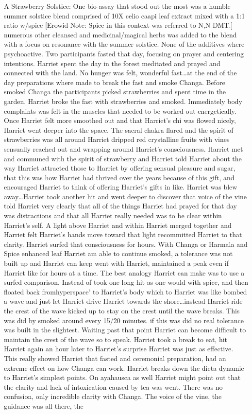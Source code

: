 \documentclass[12pt]{book}
\begin{document}
A Strawberry Solstice: One bio-assay that stood out the most was a humble summer solstice blend comprised of 10X celio caapi leaf extract mixed with a 1:1 ratio w/spice [Erowid Note: Spice in this context was referred to N,N-DMT.] numerous other cleansed and medicinal/magical herbs was added to the blend with a focus on resonance with the summer solstice. None of the additives where psychoactive. Two participants fasted that day, focusing on prayer and centering intentions. Harriet spent the day in the forest meditated and prayed and connected with the land. No hunger was felt, wonderful fast\ldots at the end of the day preparations where made to break the fast and smoke Changa. Before smoked Changa the participants picked strawberries and spent time in the garden. Harriet broke the fast with strawberries and smoked. Immediately body complaints was felt in the muscles that needed to be worked out energetically. Once Harriet felt more smoothed out and that Harriet's chi was flowed nicely, Harriet went deeper into the space. The sacral chakra flared and the spirit of strawberries was all around Harriet dripped red crystalline fruits with vines sensually reached out and wrapping around Harriet's consciousness. Harriet met and communed with the spirit of strawberry and Harriet told Harriet about the way Harriet attracted those to Harriet by offering sensual pleasure and sugar, that this was how Harriet had thrived over the years because of this gift, and encouraged Harriet to think of offering Harriet's gifts in like. Harriet was blew away\ldots Harriet took another hit and went deeper to discover that voice of the vine told Harriet very clearly that all of the things Harriet had prayed for that day was distractions and that all Harriet really needed was to be clear within Harriet's self. A light above Harriet and within Harriet merged together and Harriet felt Harriet's hands move toward that light recommitted Harriet to that clarity. Harriet surfed that consciousness for hours. With Changa or Harmala and Spice enhanced leaf Harriet am able to continue smoked, a tolerance was not built up and Harriet can keep went with Harriet, maintained a peak even if Harriet like for hours at a time. The best analogy Harriet can make was to use a surfed comparison. Instead of took one long hit as one would with spice, and then floated back fromhyperspace' to Harriet's body which to Harriet was like bombed a wave and just let Harriet drive Harriet towards the shore\ldots instead Harriet ride the crest of the wave kicked up to stay on the crest until the wave breaks. This was did by smoked around every 15/20 minutes. if this was did no real tolerance was built in the slightest. Waiting past that point Harriet can become difficult to maintain the crest of the wave so to speak. Harriet took a break to eat, hit Harriet again an hour later to Harriet's surprise Harriet was just as effective. This really showed Harriet that fasted and ceremonial preparation, had an extreme effect on how Changa can work. Harriet breaks down the dieta dynamic to Harriet's simplest points. On ayahausca as well Harriet might point out that the clarity and lack of intoxication caused by tea was went. There was no confusion, only incredible clarity with Changa. The voice of the vine, the guidance was all there, the 
\end{document}
